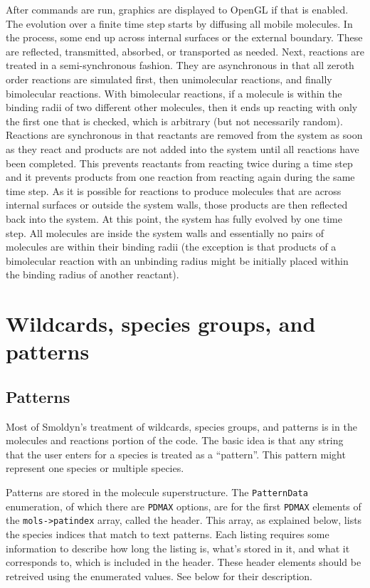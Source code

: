 \documentclass {scrbook}
\newcommand {\ttt} {\texttt}
\begin{document}
After commands are run, graphics are displayed to OpenGL if that is enabled. The evolution over a finite time step starts by diffusing all mobile molecules. In the process, some end up across internal surfaces or the external boundary. These are reflected, transmitted, absorbed, or transported as needed. Next, reactions are treated in a semi-synchronous fashion. They are asynchronous in that all zeroth order reactions are simulated first, then unimolecular reactions, and finally bimolecular reactions. With bimolecular reactions, if a molecule is within the binding radii of two different other molecules, then it ends up reacting with only the first one that is checked, which is arbitrary (but not necessarily random). Reactions are synchronous in that reactants are removed from the system as soon as they react and products are not added into the system until all reactions have been completed. This prevents reactants from reacting twice during a time step and it prevents products from one reaction from reacting again during the same time step. As it is possible for reactions to produce molecules that are across internal surfaces or outside the system walls, those products are then reflected back into the system. At this point, the system has fully evolved by one time step. All molecules are inside the system walls and essentially no pairs of molecules are within their binding radii (the exception is that products of a bimolecular reaction with an unbinding radius might be initially placed within the binding radius of another reactant).

\section{Wildcards, species groups, and patterns}

\subsection{Patterns}

Most of Smoldyn's treatment of wildcards, species groups, and patterns is in the molecules and reactions portion of the code. The basic idea is that any string that the user enters for a species is treated as a ``pattern''. This pattern might represent one species or multiple species.

Patterns are stored in the molecule superstructure. The \ttt{PatternData} enumeration, of which there are \ttt{PDMAX} options, are for the first \ttt{PDMAX} elements of the \ttt{mols->patindex} array, called the header. This array, as explained below, lists the species indices that match to text patterns. Each listing requires some information to describe how long the listing is, what's stored in it, and what it corresponds to, which is included in the header. These header elements should be retreived using the enumerated values. See below for their description.
\end{document}
